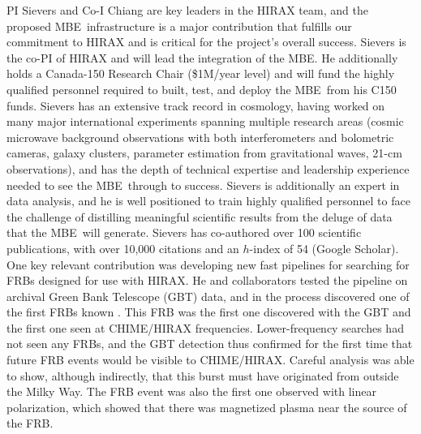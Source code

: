\documentclass[letterpaper,11pt,preprint]{aastex}
\newcommand{\mbe}{{\rm MBE}}
\begin{document}
PI Sievers and Co-I Chiang are key leaders in the HIRAX team, and the
proposed \mbe\ infrastructure is a major contribution that fulfills
our commitment to HIRAX and is critical for the project's overall
success.  Sievers is the co-PI of HIRAX and will lead the integration
of the \mbe.  He additionally holds a Canada-150 Research Chair
(\$1M/year level) and will fund the highly qualified personnel
required to built, test, and deploy the \mbe\ from his C150 funds.
Sievers has an extensive track record in cosmology, having worked on
many major international experiments spanning multiple research areas
(cosmic microwave background observations with both interferometers
and bolometric cameras, galaxy clusters, parameter estimation from
gravitational waves, 21-cm observations), and has the depth of
technical expertise and leadership experience needed to see the
\mbe\ through to success.  Sievers is additionally an expert in data
analysis, and he is well positioned to train highly qualified
personnel to face the challenge of distilling meaningful scientific
results from the deluge of data that the \mbe\ will generate.  Sievers
has co-authored over 100 scientific publications, with over 10,000
citations and an $h$-index of 54 (Google Scholar).  One key relevant
contribution was developing new fast pipelines for searching for FRBs
designed for use with HIRAX.  He and collaborators tested the pipeline
on archival Green Bank Telescope (GBT) data, and in the process
discovered one of the first FRBs known \citep{Masui15}.  This FRB was
the first one discovered with the GBT and the first one seen at
CHIME/HIRAX frequencies.  Lower-frequency searches had not seen any
FRBs, and the GBT detection thus confirmed for the first time that
future FRB events would be visible to CHIME/HIRAX.  Careful analysis
was able to show, although indirectly, that this burst must have
originated from outside the Milky Way.  The FRB event was also the
first one observed with linear polarization, which showed that there
was magnetized plasma near the source of the FRB.
\end{document}
